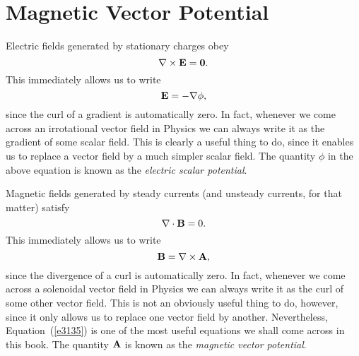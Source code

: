 \section{Magnetic Vector Potential}\label{svecs}
Electric fields generated by stationary charges obey
\begin{equation}
\nabla\times{\bf E} = {\bf 0}.
\end{equation}
This immediately allows us to write
\begin{equation}
{\bf E} = -\nabla \phi,\label{e3133}
\end{equation}
since the curl of a gradient is automatically zero. In fact, whenever we come
across an irrotational vector field in Physics we can always write it as the
gradient of some scalar field. This is clearly a useful thing to do, since it
enables us to
replace a vector field by a much simpler scalar field.
 The quantity $\phi$ in the above equation
is known as the {\em electric scalar potential}. 

Magnetic fields generated by steady currents (and unsteady currents, for that matter)
satisfy
\begin{equation}
\nabla\cdot {\bf B} = 0.
\end{equation}
This immediately allows us to write 
\begin{equation}
{\bf B} = \nabla\times{\bf A},\label{e3135}
\end{equation}
since the divergence of a curl is automatically zero. In fact, whenever we come
across a solenoidal vector field in Physics we can always write it as the curl
of some other 
vector field. This is not an obviously useful thing to do, however, since
it only allows us to replace one vector field by another. Nevertheless, Equation~(\ref{e3135})
is one of the
most useful equations we shall come across in this book. The quantity
${\bf A}$ is known as the {\em magnetic vector potential}.

